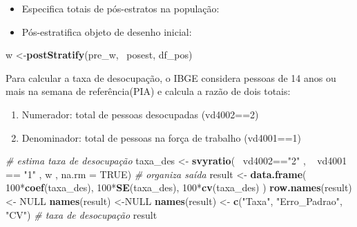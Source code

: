 \documentclass[]{book}
\newenvironment{Shaded}{\begin{snugshade}}{\end{snugshade}}
\newcommand{\KeywordTok}[1]{\textcolor[rgb]{0.13,0.29,0.53}{\textbf{{#1}}}}
\newcommand{\DataTypeTok}[1]{\textcolor[rgb]{0.13,0.29,0.53}{{#1}}}
\newcommand{\DecValTok}[1]{\textcolor[rgb]{0.00,0.00,0.81}{{#1}}}
\newcommand{\StringTok}[1]{\textcolor[rgb]{0.31,0.60,0.02}{{#1}}}
\newcommand{\CommentTok}[1]{\textcolor[rgb]{0.56,0.35,0.01}{\textit{{#1}}}}
\newcommand{\OtherTok}[1]{\textcolor[rgb]{0.56,0.35,0.01}{{#1}}}
\newcommand{\NormalTok}[1]{{#1}}
\providecommand{\tightlist}{%
  \setlength{\itemsep}{0pt}\setlength{\parskip}{0pt}}
\theoremstyle{definition}
\theoremstyle{definition}
\theoremstyle{remark}
\begin{document}
\begin{itemize}
\tightlist
\item
  Especifica totais de pós-estratos na população:
\end{itemize}

\begin{Shaded}
\end{Shaded}

\begin{itemize}
\tightlist
\item
  Pós-estratifica objeto de desenho inicial:
\end{itemize}

\begin{Shaded}
\begin{Highlighting}[]
\NormalTok{w <-}\KeywordTok{postStratify}\NormalTok{(pre_w, ~posest, df_pos)}
\end{Highlighting}
\end{Shaded}

Para calcular a taxa de desocupação, o IBGE considera pessoas de 14 anos
ou mais na semana de referência(PIA) e calcula a razão de dois totais:

\begin{enumerate}
\def\labelenumi{\arabic{enumi}.}
\item
  Numerador: total de pessoas desocupadas (vd4002==2)
\item
  Denominador: total de pessoas na força de trabalho (vd4001==1)
\end{enumerate}

\begin{Shaded}
\begin{Highlighting}[]
\CommentTok{# estima taxa de desocupação}
\NormalTok{taxa_des <-}\StringTok{ }\KeywordTok{svyratio}\NormalTok{(~}\StringTok{ }\NormalTok{vd4002==}\StringTok{"2"} \NormalTok{,}
  \NormalTok{~}\StringTok{ }\NormalTok{vd4001 ==}\StringTok{ "1"} \NormalTok{, w , }\DataTypeTok{na.rm =} \OtherTok{TRUE}\NormalTok{)}
\CommentTok{# organiza saída}
\NormalTok{result <-}\StringTok{ }\KeywordTok{data.frame}\NormalTok{(}
  \DecValTok{100}\NormalTok{*}\KeywordTok{coef}\NormalTok{(taxa_des),}
  \DecValTok{100}\NormalTok{*}\KeywordTok{SE}\NormalTok{(taxa_des), }
  \DecValTok{100}\NormalTok{*}\KeywordTok{cv}\NormalTok{(taxa_des)}
\NormalTok{)}
\KeywordTok{row.names}\NormalTok{(result)<-}\StringTok{ }\OtherTok{NULL}
\KeywordTok{names}\NormalTok{(result) <-}\OtherTok{NULL}
\KeywordTok{names}\NormalTok{(result) <-}\StringTok{ }\KeywordTok{c}\NormalTok{(}\StringTok{"Taxa"}\NormalTok{, }\StringTok{"Erro_Padrao"}\NormalTok{, }\StringTok{"CV"}\NormalTok{)}
\CommentTok{# taxa de desocupação}
\NormalTok{result}
\end{Highlighting}
\end{Shaded}
\end{document}

